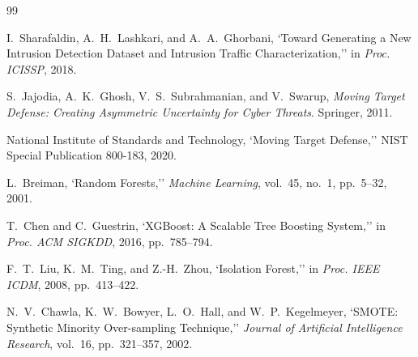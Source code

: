 \documentclass[12pt,a4paper]{report}
\begin{document}
\begin{thebibliography}{99}

 I.~Sharafaldin, A.~H.~Lashkari, and A.~A.~Ghorbani, `Toward Generating a New Intrusion Detection Dataset and Intrusion Traffic Characterization,'' in \textit{Proc. ICISSP}, 2018.

 S.~Jajodia, A.~K.~Ghosh, V.~S.~Subrahmanian, and V.~Swarup, \textit{Moving Target Defense: Creating Asymmetric Uncertainty for Cyber Threats}. Springer, 2011.

 National Institute of Standards and Technology, `Moving Target Defense,'' NIST Special Publication 800-183, 2020.

 L.~Breiman, `Random Forests,'' \textit{Machine Learning}, vol.~45, no.~1, pp.~5--32, 2001.

 T.~Chen and C.~Guestrin, `XGBoost: A Scalable Tree Boosting System,'' in \textit{Proc. ACM SIGKDD}, 2016, pp.~785--794.

 F.~T.~Liu, K.~M.~Ting, and Z.-H.~Zhou, `Isolation Forest,'' in \textit{Proc. IEEE ICDM}, 2008, pp.~413--422.

 N.~V.~Chawla, K.~W.~Bowyer, L.~O.~Hall, and W.~P.~Kegelmeyer, `SMOTE: Synthetic Minority Over-sampling Technique,'' \textit{Journal of Artificial Intelligence Research}, vol.~16, pp.~321--357, 2002.

\end{thebibliography}
\end{document}
